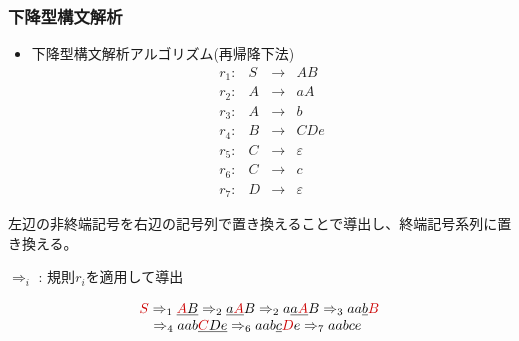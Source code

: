 \documentclass[dvipdfmx]{beamer}
\begin{document}
\begin{frame}
  \frametitle{下降型構文解析}

  \begin{itemize}
    \item 下降型構文解析アルゴリズム(再帰降下法)
          \[
            \begin{array}{lrcl}
              r_1: & S & \rightarrow & AB          \\
              r_2: & A & \rightarrow & aA          \\
              r_3: & A & \rightarrow & b           \\
              r_4: & B & \rightarrow & CDe         \\
              r_5: & C & \rightarrow & \varepsilon \\
              r_6: & C & \rightarrow & c           \\
              r_7: & D & \rightarrow & \varepsilon
            \end{array}
          \]
  \end{itemize}

  左辺の非終端記号を右辺の記号列で置き換えることで導出し、終端記号系列に置き換える。

  $\Rightarrow_i$ : 規則$r_i$を適用して導出

  \[
    \begin{array}{l}
      \redtext{S}\Rightarrow_1\underline{\redtext{A}B}\Rightarrow_2\underline{a\redtext{A}}B\Rightarrow_2 a\underline{a\redtext{A}}B\Rightarrow_3 aa\underline{b}\redtext{B} \\
      \quad \Rightarrow_4 aab\underline{\redtext{C}De}
      \Rightarrow_6 aab\underline{c}\redtext{D}e\Rightarrow_7 aabce
    \end{array}\]
\end{frame}
\end{document}
